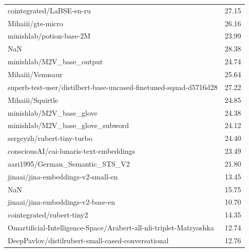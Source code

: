 \begin{xltabular}{\textwidth}{X c}
    cointegrated/LaBSE-en-ru                                             & 27.15                    \\
    Mihaiii/gte-micro                                                    & 26.16                    \\
    minishlab/potion-base-2M                                             & 23.99                    \\
    NaN                                                                  & 28.38                    \\
    minishlab/M2V\_base\_output                                          & 24.74                    \\
    Mihaiii/Venusaur                                                     & 25.64                    \\
    superb-test-user/distilbert-base-uncased-finetuned-squad-d5716d28    & 27.22                    \\
    Mihaiii/Squirtle                                                     & 24.85                    \\
    minishlab/M2V\_base\_glove                                           & 24.38                    \\
    minishlab/M2V\_base\_glove\_subword                                  & 24.12                    \\
    sergeyzh/rubert-tiny-turbo                                           & 24.40                    \\
    consciousAI/cai-lunaris-text-embeddings                              & 23.49                    \\
    aari1995/German\_Semantic\_STS\_V2                                   & 21.80                    \\
    jinaai/jina-embeddings-v2-small-en                                   & 13.45                    \\
    NaN                                                                  & 15.75                    \\
    jinaai/jina-embeddings-v2-base-en                                    & 10.70                    \\
    cointegrated/rubert-tiny2                                            & 14.35                    \\
    Omartificial-Intelligence-Space/Arabert-all-nli-triplet-Matryoshka   & 12.74                    \\
    DeepPavlov/distilrubert-small-cased-conversational                   & 12.76                    \\

\end{xltabular}
